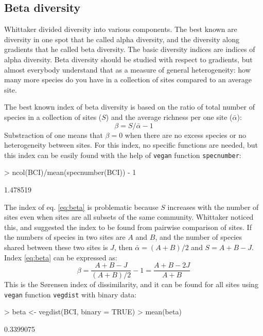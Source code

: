\documentclass[a4paper,10pt]{amsart}
\begin{document}
\subsection{Beta diversity}

Whittaker divided diversity into various components. The best known
are diversity in one spot that he called alpha diversity, and the
diversity along gradients that he called beta diversity. The basic
diversity indices are indices of alpha diversity. Beta diversity
should be studied with respect to gradients, but almost everybody
understand that as a measure of general heterogeneity: how many more
species do you have in a collection of sites compared to an average
site.

The best known index of beta diversity is based on the ratio of total
number of species in a collection of sites ($S$) and the average
richness per one site ($\bar \alpha$):
\begin{equation}
  \label{eq:beta}
  \beta = S/\bar \alpha - 1
\end{equation}
Substraction of one means that $\beta = 0$ when there are no excess
species or no heterogeneity between sites. For this index, no specific
functions are needed, but this index can be easily found with the help
of \texttt{vegan} function \texttt{specnumber}:
\begin{Schunk}
\begin{Sinput}
> ncol(BCI)/mean(specnumber(BCI)) - 1
\end{Sinput}
\begin{Soutput}
[1] 1.478519
\end{Soutput}
\end{Schunk}

The index of eq. \ref{eq:beta} is problematic because $S$ increases
with the number of sites even when sites are all subsets of the same
community.  Whittaker noticed this, and suggested the index to be
found from pairwise comparison of sites.  If the numbers of species in
two sites are $A$ and $B$, and the number of species shared between
these two sites is $J$, then $\bar \alpha = (A+B)/2$ and $S = A+B-J$.
Index \ref{eq:beta} can be expressed as:
\begin{equation}
  \label{eq:betabray}
  \beta = \frac{A+B-J}{(A+B)/2} - 1 = \frac{A+B-2J}{A+B}
\end{equation}
This is the S{\o}rensen index of dissimilarity, and it can be found
for all sites using \texttt{vegan} function \texttt{vegdist} with
binary data:
\begin{Schunk}
\begin{Sinput}
> beta <- vegdist(BCI, binary = TRUE)
> mean(beta)
\end{Sinput}
\begin{Soutput}
[1] 0.3399075
\end{Soutput}
\end{Schunk}
\end{document}
